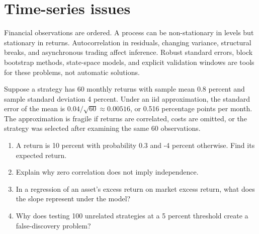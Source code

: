 \section{Time-series issues}
Financial observations are ordered. A process can be non-stationary in levels but stationary in returns. Autocorrelation in residuals, changing variance, structural breaks, and asynchronous trading affect inference. Robust standard errors, block bootstrap methods, state-space models, and explicit validation windows are tools for these problems, not automatic solutions.

\begin{worked}
Suppose a strategy has 60 monthly returns with sample mean 0.8 percent and sample standard deviation 4 percent. Under an iid approximation, the standard error of the mean is $0.04/\sqrt{60}\approx0.00516$, or 0.516 percentage points per month. The approximation is fragile if returns are correlated, costs are omitted, or the strategy was selected after examining the same 60 observations.
\end{worked}

\begin{exerciseblock}
\begin{enumerate}
  \item A return is 10 percent with probability 0.3 and -4 percent otherwise. Find its expected return.
  \item Explain why zero correlation does not imply independence.
  \item In a regression of an asset's excess return on market excess return, what does the slope represent under the model?
  \item Why does testing 100 unrelated strategies at a 5 percent threshold create a false-discovery problem?
\end{enumerate}
\end{exerciseblock}

